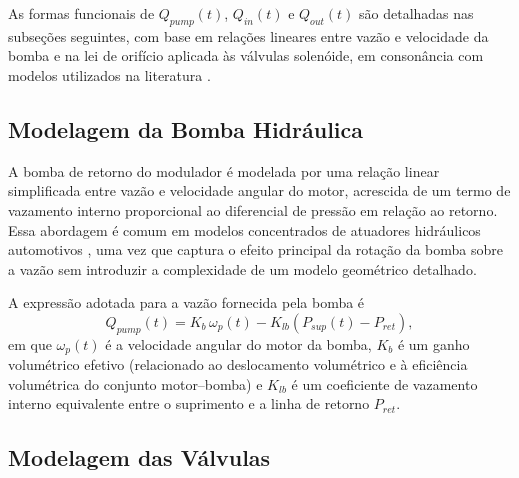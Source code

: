 As formas funcionais de $Q_{pump}(t)$, $Q_{in}(t)$ e $Q_{out}(t)$ são detalhadas nas subseções seguintes, com base em relações lineares entre vazão e velocidade da bomba e na lei de orifício aplicada às válvulas solenóide, em consonância com modelos utilizados na literatura \cite{HouhuaJing2022,ProportionalPressureABS2023,Lv2014,ChenLv2017}.

\subsection{Modelagem da Bomba Hidráulica}
\label{sec:controle-bomba-vazamento}

A bomba de retorno do modulador é modelada por uma relação linear simplificada entre vazão e velocidade angular do motor, acrescida de um termo de vazamento interno proporcional ao diferencial de pressão em relação ao retorno. Essa abordagem é comum em modelos concentrados de atuadores hidráulicos automotivos \cite{MotorParametricDesign2023,WangBingbing2015}, uma vez que captura o efeito principal da rotação da bomba sobre a vazão sem introduzir a complexidade de um modelo geométrico detalhado.

A expressão adotada para a vazão fornecida pela bomba é
\begin{equation}
    Q_{pump}(t) = K_b\,\omega_p(t) - K_{lb}\left(P_{sup}(t) - P_{ret}\right),
    \label{eq:qpump_2p}
\end{equation}
em que $\omega_p(t)$ é a velocidade angular do motor da bomba, $K_b$ é um ganho volumétrico efetivo (relacionado ao deslocamento volumétrico e à eficiência volumétrica do conjunto motor–bomba) e $K_{lb}$ é um coeficiente de vazamento interno equivalente entre o suprimento e a linha de retorno $P_{ret}$.

\subsection{Modelagem das Válvulas}
\label{sec:controle-valvulas-orificio}


